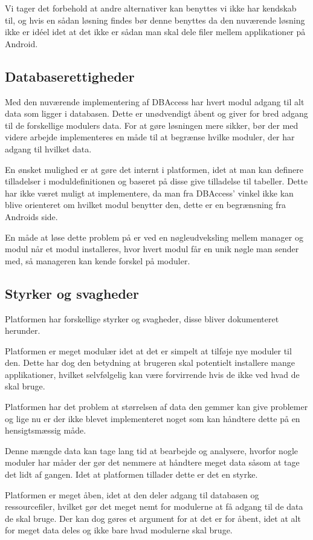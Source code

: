 Vi tager det forbehold at andre alternativer kan benyttes vi ikke har kendskab til, og hvis en sådan løsning findes bør denne benyttes da den nuværende løsning ikke er idéel idet at det ikke er sådan man skal dele filer mellem applikationer på Android.

\subsection{Databaserettigheder}\label{databaserettigheder}
Med den nuværende implementering af DBAccess har hvert modul adgang til alt data som ligger i databasen.
Dette er unødvendigt åbent og giver for bred adgang til de forskellige modulers data.
For at gøre løsningen mere sikker, bør der med videre arbejde implementeres en måde til at begrænse hvilke moduler, der har adgang til hvilket data.

En ønsket mulighed er at gøre det internt i platformen, idet at man kan definere tilladelser i moduldefinitionen og baseret på disse give tilladelse til tabeller. 
Dette har ikke været muligt at implementere, da man fra DBAccess' vinkel ikke kan blive orienteret om hvilket modul benytter den, dette er en begrænsning fra Androids side.

En måde at løse dette problem på er ved en nøgleudveksling mellem manager og modul når et modul installeres, hvor hvert modul får en unik nøgle man sender med, så manageren kan kende forskel på moduler.

\subsection{Styrker og svagheder}
Platformen har forskellige styrker og svagheder, disse bliver dokumenteret herunder. 

Platformen er meget modulær idet at det er simpelt at tilføje nye moduler til den. %
Dette har dog den betydning at brugeren skal potentielt installere mange applikationer, hvilket selvfølgelig kan være forvirrende hvis de ikke ved hvad de skal bruge. %


Platformen har det problem at størrelsen af data den gemmer kan give problemer og lige nu er der ikke blevet implementeret noget som kan håndtere dette på en hensigtsmæssig måde. %

Denne mængde data kan tage lang tid at bearbejde og analysere, hvorfor nogle moduler har måder der gør det nemmere at håndtere meget data såsom at tage det lidt af gangen.
Idet at platformen tillader dette er det en styrke. %

Platformen er meget åben, idet at den deler adgang til databasen og ressourcefiler, hvilket gør det meget nemt for modulerne at få adgang til de data de skal bruge. 
Der kan dog gøres et argument for at det er for åbent, idet at alt for meget data deles og ikke bare hvad modulerne skal bruge. 

